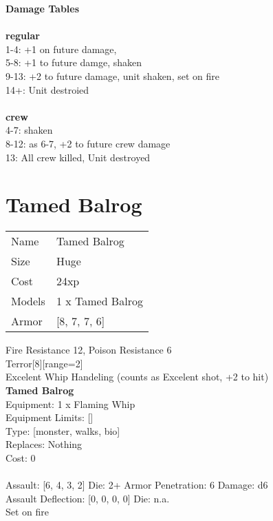 {\bf Damage Tables} \\
\ \\ {\bf regular } \\
1-4: +1 on future damage, \\
5-8: +1 to future damge, shaken \\
9-13: +2 to future damage, unit shaken, set on fire \\
14+: Unit destroied \\
\ \\ {\bf crew } \\
4-7: shaken \\
8-12: as 6-7, +2 to future crew damage \\
13: All crew killed, Unit destroyed \\










\pagebreak\pagebreak

\section{ Tamed Balrog }

\begin{tabular}{ll}
  Name & Tamed Balrog \\
  Size & Huge\\
  Cost & 24xp\\
  Models & 1 x Tamed Balrog\\
  Armor & [8, 7, 7, 6]\\
\end{tabular}

\noindent Fire Resistance 12, Poison Resistance 6\\ 
Terror[8][range=2]\\ 
Excelent Whip Handeling (counts as Excelent shot, +2 to hit)\\ 


{\bf Tamed Balrog } \\
Equipment: 1 x Flaming Whip \\
Equipment Limits: [] \\
Type: [monster, walks, bio] \\
Replaces: Nothing \\
Cost: 0\\
\ \\
Assault: [6, 4, 3, 2] Die: 2+ Armor Penetration: 6 Damage: d6 \\
Assault Deflection: [0, 0, 0, 0] Die: n.a.\\
\indent Set on fire\\ 
 
